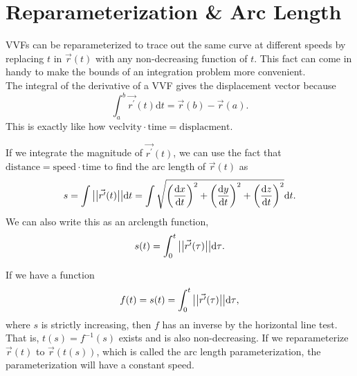 \section{Reparameterization \& Arc Length}
\noindent
VVFs can be reparameterized to trace out the same curve at different speeds by replacing $t$ in $\vec{r}(t)$ with any non-decreasing function of $t$.
This fact can come in handy to make the bounds of an integration problem more convenient.\\

\noindent
The integral of the derivative of a VVF gives the displacement vector because
\begin{equation*}
	\int_{a}^{b}{\vec{r^\prime}(t)\mathrm{d}t}=\vec{r}(b)-\vec{r}(a).
\end{equation*}
This is exactly like how $\text{veclvity} \cdot \text{time} = \text{displacment}$.

\noindent
If we integrate the magnitude of $\vec{r^\prime}(t)$, we can use the fact that $\text{distance} = \text{speed} \cdot \text{time}$ to find the arc length of $\vec{r}(t)$ as
\begin{equation*}
	s=\int{\big\lvert \big\lvert \vec{r^\prime}(t) \big\rvert \big\rvert\mathrm{d}t}=\int{\sqrt{\left(\frac{\mathrm{d}x}{\mathrm{d}t}\right)^2+\left(\frac{\mathrm{d}y}{\mathrm{d}t}\right)^2+\left(\frac{\mathrm{d}z}{\mathrm{d}t}\right)^2}\mathrm{d}t}.
\end{equation*}
We can also write this as an arclength function,
\begin{equation*}
	s(t)=\int_{0}^{t}{\big\lvert \big\lvert \vec{r^{\prime}}(\tau) \big\rvert \big\rvert\mathrm{d}\tau}.
\end{equation*}

\noindent
If we have a function
\begin{equation*}
	f(t)=s(t)=\int_{0}^{t}{\big\lvert \big\lvert \vec{r^{\prime}}(\tau) \big\rvert \big\rvert\mathrm{d}\tau},
\end{equation*}
where $s$ is strictly increasing, then $f$ has an inverse by the horizontal line test.
That is, $t(s) = f^{-1}(s)$ exists and is also non-decreasing.
If we reparameterize $\vec{r}(t)$ to $\vec{r}(t(s))$, which is called the arc length parameterization, the parameterization will have a constant speed.